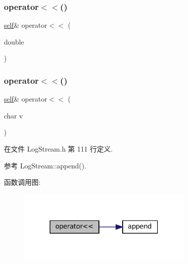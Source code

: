 \subsubsection{\texorpdfstring{operator$<$$<$()}{operator<<()}\hspace{0.1cm}{\footnotesize\ttfamily [12/18]}}
{\footnotesize\ttfamily \hyperlink{classmuduo_1_1LogStream_a85e87a809801549b949fc3f7f8c816bd}{self}\& operator$<$$<$ (\begin{DoxyParamCaption}\item[{double}]{ }\end{DoxyParamCaption})}

\mbox{\label{classmuduo_1_1LogStream_a8803799af07bd0890101f153d5008893}} 
\subsubsection{\texorpdfstring{operator$<$$<$()}{operator<<()}\hspace{0.1cm}{\footnotesize\ttfamily [13/18]}}
{\footnotesize\ttfamily \hyperlink{classmuduo_1_1LogStream_a85e87a809801549b949fc3f7f8c816bd}{self}\& operator$<$$<$ (\begin{DoxyParamCaption}\item[{char}]{v }\end{DoxyParamCaption})\hspace{0.3cm}{\ttfamily [inline]}}



在文件 Log\+Stream.\+h 第 111 行定义.



参考 Log\+Stream\+::append().

函数调用图\+:
\nopagebreak
\begin{figure}[H]
\begin{center}
\leavevmode
\includegraphics[width=243pt]{classmuduo_1_1LogStream_a8803799af07bd0890101f153d5008893_cgraph}
\end{center}
\end{figure}
\mbox{\label{classmuduo_1_1LogStream_a9f2b169c885db34149ac9eccb84fd5a7}} 
